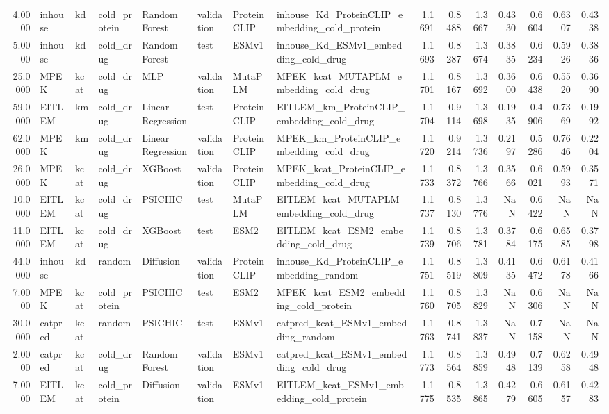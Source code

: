 \begin{tabular}{rlllllllrrrrrrr}
4.0000 & inhouse & kd & cold_protein & Random Forest & validation & ProteinCLIP & inhouse_Kd_ProteinCLIP_embedding_cold_protein & 1.1691 & 0.8488 & 1.3667 & 0.4330 & 0.6604 & 0.6307 & 0.4338 \\
5.0000 & inhouse & kd & cold_drug & Random Forest & test & ESMv1 & inhouse_Kd_ESMv1_embedding_cold_drug & 1.1693 & 0.8287 & 1.3674 & 0.3835 & 0.6234 & 0.5926 & 0.3836 \\
25.0000 & MPEK & kcat & cold_drug & MLP & validation & MutaPLM & MPEK_kcat_MUTAPLM_embedding_cold_drug & 1.1701 & 0.8167 & 1.3692 & 0.3600 & 0.6438 & 0.5520 & 0.3690 \\
59.0000 & EITLEM & km & cold_drug & Linear Regression & test & ProteinCLIP & EITLEM_km_ProteinCLIP_embedding_cold_drug & 1.1704 & 0.9114 & 1.3698 & 0.1935 & 0.4906 & 0.7369 & 0.1992 \\
62.0000 & MPEK & km & cold_drug & Linear Regression & validation & ProteinCLIP & MPEK_km_ProteinCLIP_embedding_cold_drug & 1.1720 & 0.9214 & 1.3736 & 0.2197 & 0.5286 & 0.7646 & 0.2204 \\
26.0000 & MPEK & kcat & cold_drug & XGBoost & validation & ProteinCLIP & MPEK_kcat_ProteinCLIP_embedding_cold_drug & 1.1733 & 0.8372 & 1.3766 & 0.3566 & 0.6021 & 0.5993 & 0.3571 \\
10.0000 & EITLEM & kcat & cold_drug & PSICHIC & test & MutaPLM & EITLEM_kcat_MUTAPLM_embedding_cold_drug & 1.1737 & 0.8130 & 1.3776 & NaN & 0.6422 & NaN & NaN \\
11.0000 & EITLEM & kcat & cold_drug & XGBoost & test & ESM2 & EITLEM_kcat_ESM2_embedding_cold_drug & 1.1739 & 0.8706 & 1.3781 & 0.3784 & 0.6175 & 0.6585 & 0.3798 \\
44.0000 & inhouse & kd & random & Diffusion & validation & ProteinCLIP & inhouse_Kd_ProteinCLIP_embedding_random & 1.1751 & 0.8519 & 1.3809 & 0.4135 & 0.6472 & 0.6178 & 0.4166 \\
7.0000 & MPEK & kcat & cold_protein & PSICHIC & test & ESM2 & MPEK_kcat_ESM2_embedding_cold_protein & 1.1760 & 0.8705 & 1.3829 & NaN & 0.6306 & NaN & NaN \\
30.0000 & catpred & kcat & random & PSICHIC & test & ESMv1 & catpred_kcat_ESMv1_embedding_random & 1.1763 & 0.8741 & 1.3837 & NaN & 0.7158 & NaN & NaN \\
2.0000 & catpred & kcat & cold_drug & Random Forest & validation & ESMv1 & catpred_kcat_ESMv1_embedding_cold_drug & 1.1773 & 0.8564 & 1.3859 & 0.4948 & 0.7139 & 0.6258 & 0.4948 \\
7.0000 & EITLEM & kcat & cold_protein & Diffusion & validation & ESMv1 & EITLEM_kcat_ESMv1_embedding_cold_protein & 1.1775 & 0.8535 & 1.3865 & 0.4279 & 0.6605 & 0.6157 & 0.4283 \\

\end{tabular}
